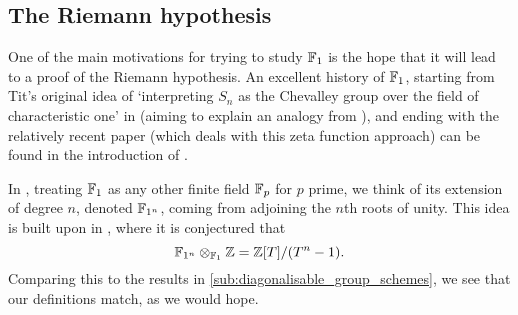 
\subsection{The Riemann hypothesis} %
\label{sub:the_riemann_hypothesis}

    One of the main motivations for trying to study $\mathbb{F}_1$ is the hope that it will lead to a proof of the Riemann hypothesis.
    An excellent history of $\mathbb{F}_1$, starting from Tit's original idea of `interpreting $S_n$ as the Chevalley group over the field of characteristic one' in \cite{Tits:1957tq} (aiming to explain an analogy from \cite{Steinberg:1951vd}), and ending with the relatively recent paper \cite{Connes:fkN5ADoK} (which deals with this zeta function approach) can be found in the introduction of \cite{Pena:2009vb}.

    In \cite{Kapranov:1996vk}, treating $\mathbb{F}_1$ as any other finite field $\mathbb{F}_p$ for $p$ prime, we think of its extension of degree $n$, denoted $\mathbb{F}_{1^n}$, coming from adjoining the $n$th roots of unity.
    This idea is built upon in \cite[\S2.4]{Soule:2008wq}, where it is conjectured that
    \begin{equation*}
        \mathbb{F}_{1^n}\otimes_{\mathbb{F}_1}\mathbb{Z} = \mathbb{Z}[T]/(T^n-1).
    \end{equation*}
    Comparing this to the results in \cref{sub:diagonalisable_group_schemes}, we see that our definitions match, as we would hope.

